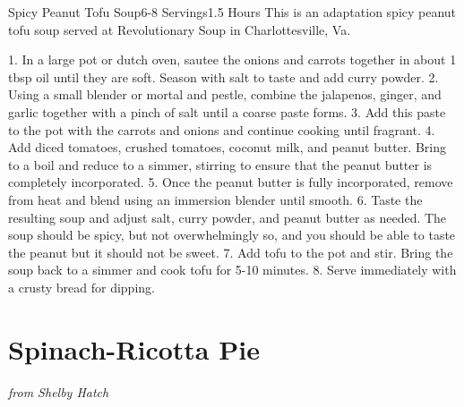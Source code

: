 \documentclass[openany]{book}
\begin{document}
\begin{recipe}{Spicy Peanut Tofu Soup}{6-8 Servings}{1.5 Hours}
\freeform This is an adaptation spicy peanut tofu soup served at Revolutionary Soup in Charlottesville, Va.

1. In a large pot or dutch oven, sautee the onions and carrots together in about 1 tbsp oil until they are soft. Season with salt to taste and add curry powder.
2. Using a small blender or mortal and pestle, combine the jalapenos, ginger, and garlic together with a pinch of salt until a coarse paste forms.
3. Add this paste to the pot with the carrots and onions and continue cooking until fragrant.
4. Add diced tomatoes, crushed tomatoes, coconut milk, and peanut butter.  Bring to a boil and reduce to a simmer, stirring to ensure that the peanut butter is completely incorporated.
5. Once the peanut butter is fully incorporated, remove from heat and blend using an immersion blender until smooth.
6. Taste the resulting soup and adjust salt, curry powder, and peanut butter as needed. The soup should be spicy, but not overwhelmingly so, and you should be able to taste the peanut but it should not be sweet.
7. Add tofu to the pot and stir. Bring the soup back to a simmer and cook tofu for 5-10 minutes.
8. Serve immediately with a crusty bread for dipping.

\end{recipe}

\chapter{Spinach-Ricotta Pie}\label{spinach-ricotta-pie}

\emph{from Shelby Hatch}
\end{document}
